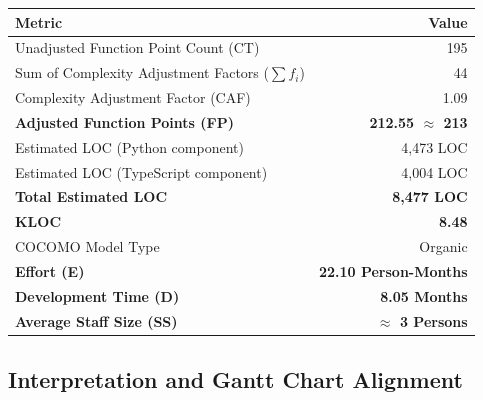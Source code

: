 \documentclass[11pt, a4paper]{article}
\begin{document}
\begin{center}
\renewcommand{\arraystretch}{1.4}
\begin{tabular}{|l|r|}
\hline
\textbf{Metric} & \textbf{Value} \\ \hline
Unadjusted Function Point Count (CT)              & 195             \\ \hline
Sum of Complexity Adjustment Factors ($\sum f_i$)  & 44              \\ \hline
Complexity Adjustment Factor (CAF)                 & 1.09            \\ \hline
\textbf{Adjusted Function Points (FP)}             & \textbf{212.55 $\approx$ 213} \\ \hline
\hline
Estimated LOC (Python component)                   & 4,473 LOC       \\ \hline
Estimated LOC (TypeScript component)               & 4,004 LOC       \\ \hline
\textbf{Total Estimated LOC}                       & \textbf{8,477 LOC}  \\ \hline
\textbf{KLOC}                                      & \textbf{8.48}   \\ \hline
\hline
COCOMO Model Type                                  & Organic         \\ \hline
\textbf{Effort (E)}                                & \textbf{22.10 Person-Months} \\ \hline
\textbf{Development Time (D)}                      & \textbf{8.05 Months}         \\ \hline
\textbf{Average Staff Size (SS)}                   & \textbf{$\approx$ 3 Persons} \\ \hline
\end{tabular}
\end{center}

\vspace{1cm}

\subsection{Interpretation and Gantt Chart Alignment}
\end{document}
